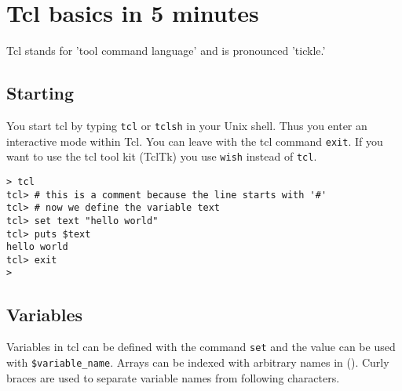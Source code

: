 
\section{Tcl basics in 5 minutes}

Tcl stands for 'tool command language' and is pronounced 'tickle.'

\subsection*{Starting}

You start tcl by typing  \texttt{tcl}  or \texttt{tclsh} in your  Unix
shell. Thus  you enter an interactive mode  within Tcl.  You can leave
with the tcl  command \texttt{exit}. If you  want to use the  tcl tool
kit (TclTk) you use \texttt{wish} instead of \texttt{tcl}.

\begin{verbatim}
> tcl
tcl> # this is a comment because the line starts with '#'
tcl> # now we define the variable text
tcl> set text "hello world"
tcl> puts $text
hello world
tcl> exit
>
\end{verbatim}


\subsection*{Variables}

Variables in tcl can be defined with the  command \texttt{set} and the
value can be     used with \texttt{\$variable\_name}.  Arrays can   be
indexed with arbitrary names in (). Curly  braces are used to separate
variable names from following characters.

